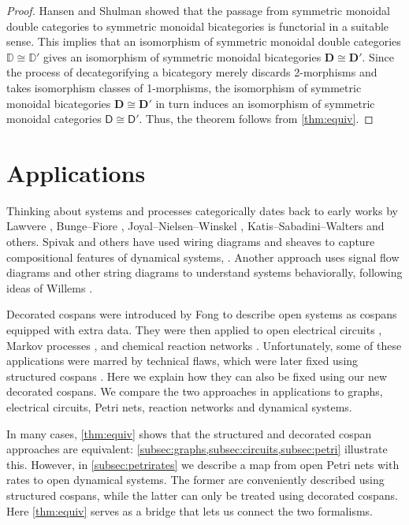 \documentclass[reqno]{amsart}
\theoremstyle{definition}
\theoremstyle{remark}
\newcommand{\D}{\mathsf{D}}
\newcommand{\bicat}{\mathbf}
\newcommand{\bD}{\bicat{D}}
\newcommand{\double}[1]{\mathbf{\mathbb #1}}
\newcommand{\lD}{\double{D}}
\begin{document}
\begin{proof} 
Hansen and Shulman \cite{HS} showed that the passage from symmetric monoidal double categories to symmetric monoidal bicategories is functorial in a suitable sense.  This implies that an isomorphism of symmetric monoidal double categories $\lD \cong \lD'$ gives an isomorphism of symmetric monoidal bicategories $\bD \cong \bD'$.    Since the process of decategorifying a bicategory merely discards 2-morphisms and takes isomorphism classes of 1-morphisms, the isomorphism of symmetric monoidal bicategories $\bD \cong \bD'$ in turn induces an isomorphism of symmetric monoidal categories $\D \cong \D'$.   Thus, the theorem follows from \cref{thm:equiv}. \end{proof}

\section{Applications}\label{Applications}

Thinking about systems and processes categorically dates back to early works by Lawvere \cite{Lawvere}, Bunge--Fiore \cite{BungeFiore}, Joyal--Nielsen--Winskel \cite{JNW}, Katis--Sabadini--Walters \cite{KSW} and others.   Spivak and others have used wiring diagrams and sheaves to capture compositional features of dynamical systems, \cite{BFV,SSV,VSL}.  Another approach uses signal flow diagrams and other string diagrams \cite{BE,BSZ,FRS} to understand systems behaviorally, following ideas of Willems \cite{Willems}.  
 
Decorated cospans were introduced by Fong \cite{Fong,FongThesis} to describe open systems as cospans equipped with extra data.  They were then applied to open electrical circuits \cite{BF}, Markov processes \cite{BFP}, and chemical reaction networks \cite{BP}.  Unfortunately, some of these applications were marred by technical flaws, which were later fixed using structured cospans \cite{BC}. Here we explain how they can also be fixed using our new decorated cospans.  We compare the two approaches in applications to graphs, electrical circuits, Petri nets, reaction networks and dynamical systems. 

In many cases, \cref{thm:equiv} shows that the structured and decorated cospan approaches are equivalent: \cref{subsec:graphs,subsec:circuits,subsec:petri} illustrate this.   However, in \cref{subsec:petrirates} we describe a map from open Petri nets with rates to open dynamical systems.  The former are conveniently described using structured cospans, while the latter can only be treated using decorated cospans.   Here \cref{thm:equiv} serves as a bridge that lets us connect the two formalisms.
\end{document}
